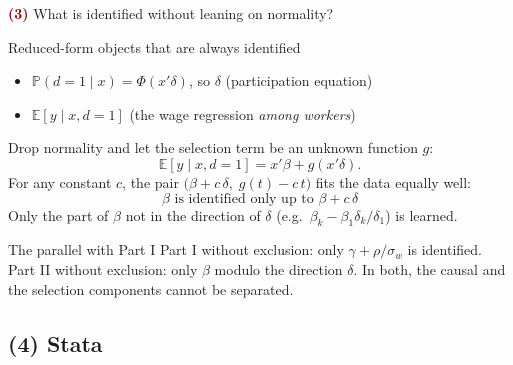 \documentclass[aspectratio=169,11pt]{beamer}
\newcommand{\E}{\mathbb{E}}
\newcommand{\Pp}{\mathbb{P}}
\newcommand{\Part}[1]{\textcolor{DarkRed}{\textbf{(#1)}}}
\begin{document}
\begin{frame}{\Part{3} What is identified without leaning on normality?}

\begin{block}{Reduced-form objects that are always identified}
\begin{itemize}
  \item $\Pp(d=1\mid x)=\Phi(x'\delta)$, so $\delta$ \hfill (participation equation)
  \item $\E[y\mid x,d=1]$ \hfill (the wage regression \emph{among workers})
\end{itemize}
\end{block}

\pause

Drop normality and let the selection term be an unknown function $g$:
\[
\E[y\mid x,d=1]=x'\beta+g(x'\delta).
\]
For any constant $c$, the pair $\big(\beta+c\,\delta,\;g(t)-c\,t\big)$ fits the
data equally well:
\[
\boxed{\beta \text{ is identified only up to } \beta+c\,\delta}
\]
Only the part of $\beta$ not in the direction of $\delta$
(e.g.\ $\beta_k-\beta_1\delta_k/\delta_1$) is learned.

\pause

\begin{alertblock}{The parallel with Part I}
Part I without exclusion: only $\gamma+\rho/\sigma_w$ is identified.
Part II without exclusion: only $\beta$ modulo the direction $\delta$.
In both, the causal and the selection components cannot be separated.
\end{alertblock}

\end{frame}

\subsection{(4) Stata}
\end{document}

